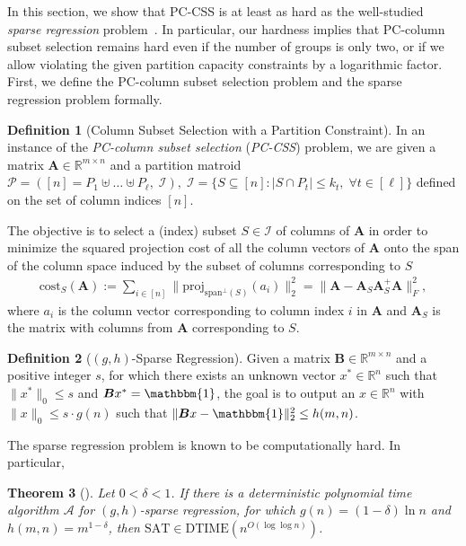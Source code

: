 \documentclass[11pt]{article}
\newcommand{\sumL}{\sum\limits}
\theoremstyle{plain}
\newtheorem{theorem}{Theorem}[section]
\theoremstyle{plain}
\theoremstyle{definition}
\newtheorem{defn}[theorem]{Definition}
\theoremstyle{plain}
\theoremstyle{remark}
\newcommand{\RR}{\mathbb{R}}
\newcommand{\cA}{\mathcal{A}}
\newcommand{\cI}{\mathcal{I}}
\newcommand{\cP}{\mathcal{P}}
\DeclareRobustCommand{\fairCSSx}{PC-column subset selection}
\DeclareRobustCommand{\fairCSS}{\mbox{PC-CSS}}
\begin{document}
In this section, we show that \fairCSS{} is at least as hard as the well-studied \emph{sparse regression} problem~\cite{natarajan1995sparse,FKT15,har2018approximate,gupte2021fine}. In particular, our hardness implies that \fairCSSx{} remains hard even if the number of groups is only two, or if we allow violating the given partition capacity constraints by a logarithmic factor. First, we define the \fairCSSx{} problem and the sparse regression problem formally. 

\begin{defn}[Column Subset Selection with a Partition Constraint]
\label{def:fair-css}
    In an instance of the \emph{\fairCSSx} (\emph{\fairCSS}) problem, we are 
    given a matrix $\bm{A}\in \RR^{m\times n}$ and a partition matroid $\cP=([n]=P_1\uplus\dots \uplus P_{\ell},\;\cI), \; \cI=\{S\subseteq [n]: |S\cap P_{t}|\leq k_{t}, \; \forall t \in [\ell]\}$ defined on the set of column indices $[n]$. 
    
    The objective is to select a (index) subset $S\in \cI$ of columns of $\bm{A}$ in order to minimize the squared projection cost of all the column vectors of $\bm{A}$ onto the span of the column space induced by the subset of columns corresponding to $S$
    \begin{align}
        \text{cost}_{S}(\bm{A}):= \sumL_{i\in [n]}\|\text{proj}_{\text{span}^\bot(S)}(a_i)\|_2^2 = \|\bm{A}-\bm{A}_S\bm{A}_S^+\bm{A}\|_F^2,
\end{align}  
  where $a_i$ is the column vector corresponding to column index $i$ in $\bm{A}$ and $\bm{A}_S$ is the matrix with columns from $\bm{A} $  corresponding to $S$.
\end{defn}



\begin{defn}[$(g,h)$-Sparse Regression]
Given a matrix $\bm{B} \in \mathbb{R}^{m\times n}$ and a positive integer $s$, for which there exists an unknown vector $x^* \in \mathbb{R}^n$ such that $\|x^*\|_0\leq s$ and $\bm{B}x^*= \mathbbm{1}$, the goal is to output an $x \in \mathbb{R}^n$ with $\|x\|_0 \leq s\cdot g(n)$ such that $\|\bm{B}x-\mathbbm{1}\|_2^2\leq h(m,n)$. \end{defn}



The sparse regression problem is known to be computationally hard. In particular, 
\begin{theorem}[\cite{FKT15}]
    Let $0<\delta <1$. If there is a deterministic polynomial time algorithm $\cA$ for $(g,h)$-sparse regression, for which $g(n)=(1-\delta)\ln n$ and $h(m,n)=m^{1-\delta}$, then $\mathrm{SAT} \in \mathrm{DTIME}(n^{O(\log \log n)})$.   
\end{theorem}
\end{document}
